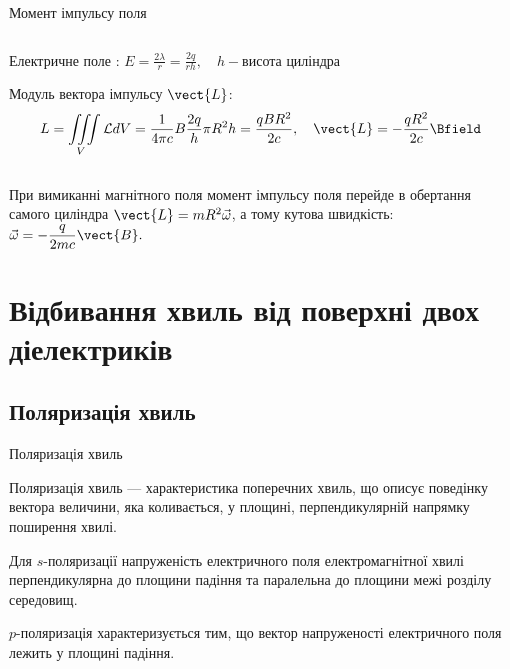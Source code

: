 \documentclass[onlytextwidth]{beamer}
\begin{document}
\begin{frame}{Момент імпульсу поля}{}
\begin{columns}
\begin{column}{0.75\linewidth}
\begin{block}{}
				Електричне поле :
				\(\displaystyle
				E = \frac{2\lambda}{r} = \frac{2q}{rh}, \quad h - \text{висота циліндра}
				\)

				Модуль вектора імпульсу $ \vect{L} $:
				\begin{equation*}
					L = \iiint\limits_V\mathcal{L} dV = \frac{1}{4\pi c} B \frac{2q}{h} \pi R^2 h = \frac{qBR^2}{2c}, \quad \vect{L} = - \frac{qR^2}{2c}
					\Bfield
				\end{equation*}
			\end{block}
		\end{column}
	\end{columns}
	\begin{block}{}\justifying
		При вимиканні магнітного поля момент імпульсу поля перейде в обертання самого циліндра $ \vect{L} = mR^2\vec\omega
		$, а тому кутова швидкість:
		\(
		\displaystyle	\vec{\omega} = -\frac{q}{2mc}\vect{B}.
		\)
	\end{block}
\end{frame}


\section{Відбивання хвиль від поверхні двох діелектриків}




\subsection{Поляризація хвиль}




\begin{frame}{Поляризація хвиль}{}
	\begin{block}{}\justifying
		\alert{Поляризація хвиль} --- характеристика поперечних хвиль, що описує поведінку вектора величини, яка коливається, у площині, перпендикулярній
		напрямку поширення хвилі.
	\end{block}
	\begin{block}{}\justifying
		Для \alert{$s$-поляризації} напруженість електричного поля електромагнітної хвилі перпендикулярна до площини падіння та паралельна до площини межі
		розділу середовищ.
	\end{block}
	\begin{block}{}\justifying
		\alert{$p$-поляризація} характеризується тим, що
		вектор напруженості електричного поля лежить у площині падіння.
	\end{block}
\end{frame}
\end{document}
